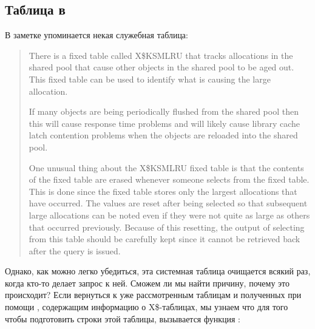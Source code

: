 \subsection{Таблица  в \oracle}
\myindex{\oracle}

В заметке  упоминается некая служебная таблица:

\begin{framed}
\begin{quotation}
There is a fixed table called X\$KSMLRU that tracks allocations in the shared pool that cause other objects 
in the shared pool to be aged out. This fixed table can be used to identify what is causing the large allocation.

If many objects are being periodically flushed from the shared pool then this will cause response time problems 
and will likely cause library cache latch contention problems when the objects are reloaded into the shared pool.

One unusual thing about the X\$KSMLRU fixed table is that the contents of the fixed table are erased whenever 
someone selects from the fixed table. This is done since the fixed table stores only the largest allocations 
that have occurred. The values are reset after being selected so that subsequent large allocations can be noted 
even if they were not quite as large as others that occurred previously. Because of this resetting, the output 
of selecting from this table should be carefully kept since it cannot be retrieved back after the query is issued.
\end{quotation}
\end{framed}

Однако, как можно легко убедиться, эта системная таблица очищается всякий раз, когда кто-то делает запрос 
к ней.
Сможем ли мы найти причину, почему это происходит?
Если вернуться к уже рассмотренным таблицам  и  полученных при помощи \oracletables, 
содержащим информацию о X\$-таблицах, мы узнаем что для того чтобы подготовить строки этой таблицы, 
вызывается функция :

